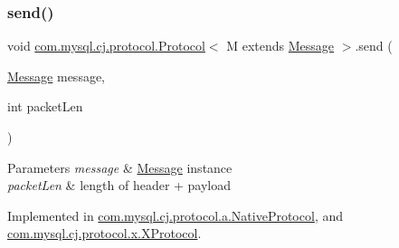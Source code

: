 \mbox{\label{interfacecom_1_1mysql_1_1cj_1_1protocol_1_1_protocol_ae917ec7bc23dc3244bea8e745318c725}} 
\subsubsection{\texorpdfstring{send()}{send()}}
{\footnotesize\ttfamily void \mbox{\hyperlink{interfacecom_1_1mysql_1_1cj_1_1protocol_1_1_protocol}{com.\+mysql.\+cj.\+protocol.\+Protocol}}$<$ M extends \mbox{\hyperlink{interfacecom_1_1mysql_1_1cj_1_1protocol_1_1_message}{Message}} $>$.send (\begin{DoxyParamCaption}\item[{\mbox{\hyperlink{interfacecom_1_1mysql_1_1cj_1_1protocol_1_1_message}{Message}}}]{message,  }\item[{int}]{packet\+Len }\end{DoxyParamCaption})}


\begin{DoxyParams}{Parameters}
{\em message} & \mbox{\hyperlink{interfacecom_1_1mysql_1_1cj_1_1protocol_1_1_message}{Message}} instance \\
\hline
{\em packet\+Len} & length of header + payload \\
\hline
\end{DoxyParams}


Implemented in \mbox{\hyperlink{classcom_1_1mysql_1_1cj_1_1protocol_1_1a_1_1_native_protocol_ab8fc56f3c8cbc5abba6cb7c485f534f1}{com.\+mysql.\+cj.\+protocol.\+a.\+Native\+Protocol}}, and \mbox{\hyperlink{classcom_1_1mysql_1_1cj_1_1protocol_1_1x_1_1_x_protocol_ac6e989e8d119f8c1efd0fda253199727}{com.\+mysql.\+cj.\+protocol.\+x.\+X\+Protocol}}.

\mbox{\label{interfacecom_1_1mysql_1_1cj_1_1protocol_1_1_protocol_aaef9b7f93e895f19b2f6bc13ec5c2295}} 
